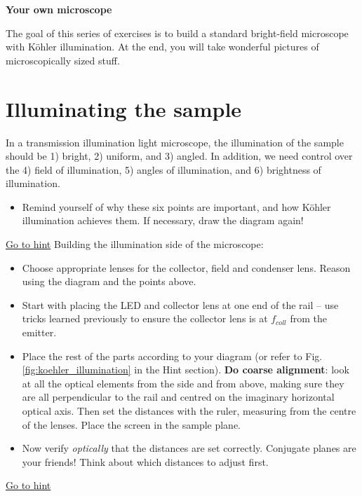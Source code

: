 \documentclass[a4paper]{report}
\begin{document}
\setcounter{secnumdepth}{2}

\begin{center}
	\textbf{\Large{Your own microscope}}
\end{center}


\vspace{0.8cm}
\noindent
The goal of this series of exercises is to build a standard bright-field microscope with K\"{o}hler illumination.
At the end, you will take wonderful pictures of microscopically sized stuff.
\section{Illuminating the sample}
\hypertarget{hintBack-illumination}{}
In a transmission illumination light microscope, the illumination of the sample should be 1) bright, 2) uniform, and 3) angled. In addition, we need control over the 4) field of illumination, 5) angles of illumination, and 6) brightness of illumination.
\begin{itemize}
    \item Remind yourself of why these six points are important, and how K\"{o}hler illumination achieves them. If necessary, draw the diagram again!
\end{itemize}
   \noindent
\hyperlink{hintTo-illumination}{Go to hint}
   Building the illumination side of the microscope:
   \begin{itemize}
       \item Choose appropriate lenses for the collector, field and condenser lens. Reason using the diagram and the points above.
       \item Start with placing the LED and collector lens at one end of the rail -- use tricks learned previously to ensure the collector lens is at $f_{coll}$ from the emitter.
       \item Place the rest of the parts according to your diagram (or refer to Fig. \ref{fig:koehler_illumination} in the Hint section). \textbf{Do coarse alignment}: look at all the optical elements from the side and from above, making sure they are all perpendicular to the rail and centred on the imaginary horizontal optical axis. Then set the distances with the ruler, measuring from the centre of the lenses. Place the screen in the sample plane.
       \item Now verify \emph{optically} that the distances are set correctly. Conjugate planes are your friends! Think about which distances to adjust first.
   \end{itemize}
   \noindent
\hyperlink{hintTo-illumination}{Go to hint}
\end{document}
